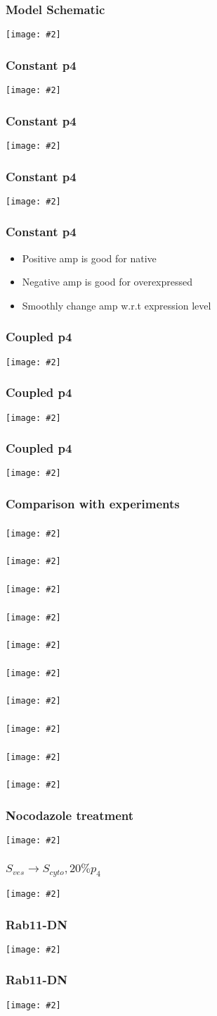 \documentclass{beamer}
\newcommand{\plotslide}[2]{
  \begin{frame}
    \frametitle{#1}
    \centering
    \texttt{[image: \#2]}
  \end{frame}
}
\begin{document}
\plotslide{Model Schematic}{../tikz/flow.pdf}

\plotslide{Constant p4}{constant_p4_func.pdf}
\plotslide{Constant p4}{p4a_sign_change_Sves.pdf}
\plotslide{Constant p4}{p4a_sign_change_MI.pdf}

\begin{frame}
  \frametitle{Constant p4}
  \begin{itemize}
    \item Positive amp is good for native
    \item Negative amp is good for overexpressed
    \item Smoothly change amp w.r.t expression level
  \end{itemize}
\end{frame}

\plotslide{Coupled p4}{coupled_p4_func.pdf}
\plotslide{Coupled p4}{Sves_coupled_p4.pdf}
\plotslide{Coupled p4}{MI_coupled_p4.pdf}


\begin{frame}
  \frametitle{Comparison with experiments}
\end{frame}

\plotslide{}{StotVsMAPKpp.pdf}

\plotslide{}{SmemVsp3.pdf}

\plotslide{}{../hao/dose_response_ERK_t.png}
\plotslide{}{InputVsMAPKpp.pdf}

\plotslide{}{../hao/dose_response_MI_t.png}
\plotslide{}{InputVsMI.pdf}

\plotslide{}{../hao/exp-MIvsS_t.png}
\plotslide{}{ScaffoldVsMAPKppMI.pdf}

\plotslide{}{../hao/gradient_response_t.png}
\plotslide{}{GradientVsMI.pdf}

\plotslide{Nocodazole treatment}{../hao/noco_t.png}
\plotslide{$S_{ves} \rightarrow S_{cyto}, 20\%  p_4 $}{noco.pdf}

\plotslide{Rab11-DN}{../hao/Rab11DN_t.png}
\plotslide{Rab11-DN}{rab11dn.pdf}

\end{document}
